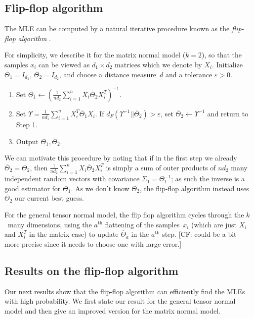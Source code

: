 \documentclass[aos]{imsart}
\theoremstyle{definition}
\numberwithin{equation}{section}
\newcommand{\eps}{\varepsilon}
\newcommand{\samp}{x}
\newcommand{\CF}[1]{{\color{purple}[CF: #1]}}
\begin{document}
\subsection{Flip-flop algorithm}
The MLE can be computed by a natural iterative procedure known as the \emph{flip-flop algorithm} \citep{dutilleul1999mle,gurvits2004classical}.

For simplicity, we describe it for the matrix normal model ($k=2$), so that the samples $\samp_i$ can be viewed as $d_1\times d_2$ matrices which we denote by $X_i$.
Initialize $\overline{\Theta}_1 = I_{d_1}$, $\overline{\Theta}_2 = I_{d_2}$, and choose a distance measure~$d$ and a tolerance $\eps > 0$.
\begin{enumerate}
\item Set $\overline{\Theta}_1 \leftarrow (\frac{1}{n d_2} \sum_{i = 1}^n X_i \overline{\Theta}_2 X_i^T)^{-1}.$
\item Set $\Upsilon = \frac{1}{n d_1} \sum_{i = 1}^n X_i^T \overline{\Theta}_1 X_i$.
If $d_F( \Upsilon^{-1}|| \overline{\Theta}_2) > \eps$, set $\overline{\Theta}_2 \leftarrow \Upsilon^{-1}$ and return to Step 1.
\item Output $\overline{\Theta}_1, \overline{\Theta}_2$.
\end{enumerate}

We can motivate this procedure by noting that if in the first step we already $\overline{\Theta}_2 = \Theta_2$, then $\frac{1}{n d_2} \sum_{i = 1}^n X_i \overline{\Theta}_2 X_i^T$ is simply a sum of outer products of $nd_2$ many independent random vectors with covariance $\Sigma_1 = \Theta_1^{-1}$; as such the inverse is a good estimator for $\Theta_1$.
As we don't know $\Theta_2$, the flip-flop algorithm instead uses $\overline{\Theta}_2$ our current best guess.

For the general tensor normal model, the flip flop algorithm cycles through the $k$~many dimensions, using the $a^\text{th}$ flattening of the samples~$x_i$ (which are just $X_i$ and $X_i^T$ in the matrix case) to update $\overline{\Theta}_a$ in the $a^\text{th}$ step.
\CF{could be a bit more precise since it needs to choose one with large error.}

\subsection{Results on the flip-flop algorithm}
Our next results show that the flip-flop algorithm can efficiently find the MLEs with high probability.
We first state our result for the general tensor normal model and then give an improved version for the matrix normal model.
\end{document}
